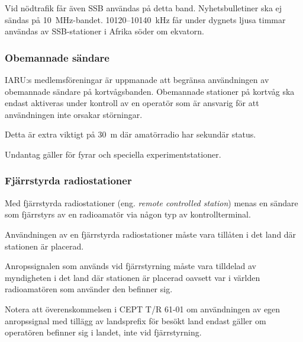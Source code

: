 Vid nödtrafik får även SSB användas på detta band.
Nyhetsbulletiner ska ej sändas på 10~MHz-bandet.
10120--10140~kHz får under dygnets ljusa timmar användas av
SSB-stationer i Afrika söder om ekvatorn.

\subsubsection{Obemannade sändare}

IARU:s medlemsföreningar är uppmanade att begränsa användningen av obemannade
sändare på kortvågsbanden.
Obemannade stationer på kortvåg ska endast aktiveras under kontroll av en
operatör som är ansvarig för att användningen inte orsakar störningar.

Detta är extra viktigt på 30~m där amatörradio har sekundär status.

Undantag gäller för fyrar och speciella experimentstationer.

\subsubsection{Fjärrstyrda radiostationer}

Med fjärrstyrda radiostationer (eng. \emph{remote controlled station}) menas en
sändare som fjärrstyrs av en radioamatör via någon typ av kontrollterminal.

Användningen av en fjärrstyrda radiostationer måste vara tillåten i det land där
stationen är placerad.

Anropssignalen som används vid fjärrstyrning måste vara tilldelad av myndigheten
i det land där stationen är placerad oavsett var i världen radioamatören som
använder den befinner sig.

Notera att överenskommelsen i CEPT T/R 61-01 \cite{TR6101} om användningen av
egen anropssignal med tillägg av landsprefix för besökt land endast gäller om
operatören befinner sig i landet, inte vid fjärrstyrning.

\twocolumn
